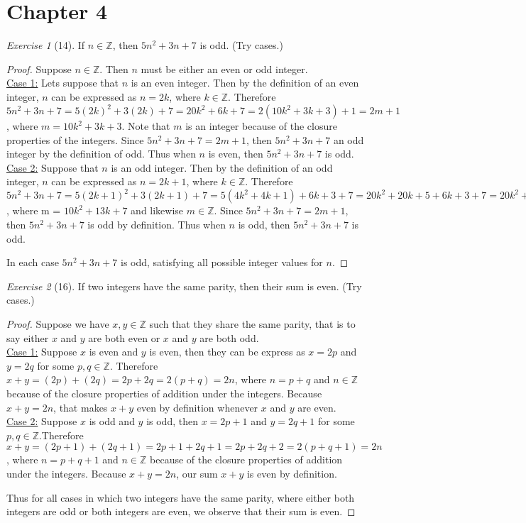 \documentclass[12pt]{amsart}
\theoremstyle{remark}
\newtheorem*{exercise}{Exercise}%
\def\ZZ{\ensuremath{\mathbb Z}}
\theoremstyle{mycomment}
\begin{document}
\thispagestyle{fancy}
\section*{Chapter 4}
\begin{exercise}[14] If $n\in\ZZ$, then $5n^{2}+3n+7$ is odd. (Try cases.)
\begin{proof}
Suppose $n \in \ZZ$. Then $n$ must be either an even or odd integer. 
\\ \underline{Case 1:} Lets suppose that $n$ is an even integer. Then by the definition of an even integer, $n$ can be expressed as $n = 2k$, where $k \in \ZZ$. Therefore $5n^2 + 3n + 7 = 5(2k)^2 + 3(2k) + 7 = 20k^2 + 6k + 7 =2(10k^2 + 3k + 3) + 1 = 2m + 1$, where $m = 10k^2 + 3k + 3$. Note that $m$ is an integer because of the closure properties of the integers. Since $5n^{2}+3n+7 = 2m + 1$, then $5n^{2}+3n+7$ an odd integer by the definition of odd. Thus when $n$ is even, then $5n^{2}+3n+7$ is odd.
\\ \underline{Case 2:} Suppose that $n$ is an odd integer. Then by the definition of an odd integer, $n$ can be expressed as $n = 2k + 1$, where $k \in \ZZ$. Therefore $5n^2 + 3n + 7 = 5(2k+1)^2 + 3(2k+1) + 7 = 5(4k^2 +4k + 1)+ 6k+ 3 + 7 = 20k^2 + 20k + 5 + 6k + 3 + 7 = 20k^2 + 26k + 15 = 2(10k^2 + 13k + 7) + 1 = 2m + 1$, where m = $10k^2 + 13k +7$ and likewise $m \in \ZZ$. Since $5n^2 + 3n + 7 = 2m +1$, then $5n^2 + 3n + 7$ is odd by definition. Thus when $n$ is odd, then $5n^2 + 3n + 7$ is odd. 

In each case $5n^2 + 3n + 7$ is odd, satisfying all possible integer values for $n$.
\end{proof}
\end{exercise}

\begin{exercise}[16] If two integers have the same parity, then their sum is even. (Try cases.)
\begin{proof}
Suppose we have $x,y \in \ZZ$ such that they share the same parity, that is to say either $x$ and $y$ are both even or $x$ and $y$ are both odd. \\
\underline{Case 1:} Suppose $x$ is even and $y$ is even, then they can be express as $x = 2p$ and $y = 2q$ for some $p,q \in \ZZ$. Therefore $x + y = (2p) + (2q) = 2p + 2q = 2(p+q) = 2n$, where $n = p + q$ and $n \in \ZZ$ because of the closure properties of addition under the integers. Because $x + y = 2n$, that makes $x + y$ even by definition whenever $x$ and $y$ are even. \\
\underline{Case 2:} Suppose $x$ is odd and $y$ is odd, then $x = 2p + 1$ and $y = 2q + 1$ for some $p,q \in \ZZ$.Therefore $x + y = (2p + 1) + (2q + 1) = 2p + 1 + 2q + 1 = 2p + 2q + 2 = 2(p + q + 1) = 2n$, where $n = p + q + 1$ and $n \in \ZZ$ because of the closure properties of addition under the integers. Because $x + y = 2n$, our sum $x + y$ is even by definition. 

Thus for all cases in which two integers have the same parity, where either both integers are odd or both integers are even, we observe that their sum is even.
\end{proof}
\end{exercise}
\end{document}
